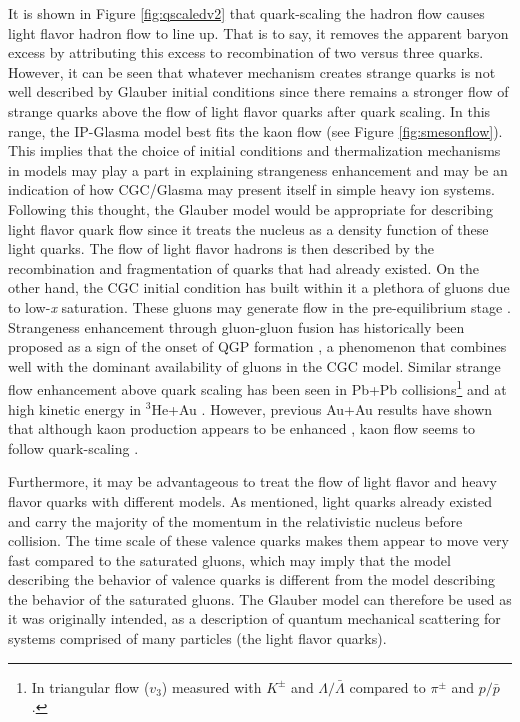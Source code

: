 It is shown in Figure \ref{fig:qscaledv2} that quark-scaling the hadron flow causes light flavor hadron flow to line up. That is to say, it removes the apparent baryon excess by attributing this excess to recombination of two versus three quarks. However, it can be seen that whatever mechanism creates strange quarks is not well described by Glauber initial conditions since there remains a stronger flow of strange quarks above the flow of light flavor quarks after quark scaling. In this range, the IP-Glasma model best fits the kaon flow (see Figure \ref{fig:smesonflow}). This implies that the choice of initial conditions and thermalization mechanisms in models may play a part in explaining strangeness enhancement and may be an indication of how CGC/Glasma may present itself in simple heavy ion systems. Following this thought, the Glauber model would be appropriate for describing light flavor quark flow since it treats the nucleus as a density function of these light quarks. The flow of light flavor hadrons is then described by the recombination and fragmentation of quarks that had already existed. On the other hand, the CGC initial condition has built within it a plethora of gluons due to low-\textit{x} saturation. These gluons may generate flow in the pre-equilibrium stage \citep{Krasnitz200321}. Strangeness enhancement through gluon-gluon fusion has historically been proposed as a sign of the onset of QGP formation \citep{PhysRevLett.48.1066}, a phenomenon that combines well with the dominant availability of gluons in the CGC model. Similar strange flow enhancement above quark scaling has been seen in Pb+Pb collisions\footnote{In triangular flow ($v_3$) measured with $K^{\pm}$ and $\Lambda/\bar{\Lambda}$ compared to $\pi^{\pm}$ and $p/\bar{p}$.} \citep{1742-6596-668-1-012099} and at high kinetic energy in $^3$He+Au \citep{huangQM2015}. However, previous Au+Au results have shown that although kaon production appears to be enhanced \citep{Hohne:1999jf}, kaon flow seems to follow quark-scaling \citep{PhysRevC.92.034913}. 

Furthermore, it may be advantageous to treat the flow of light flavor and heavy flavor quarks with different models. As mentioned, light quarks already existed and carry the majority of the momentum in the relativistic nucleus before collision. The time scale of these valence quarks makes them appear to move very fast compared to the saturated gluons, which may imply that the model describing the behavior of valence quarks is different from the model describing the behavior of the saturated gluons. The Glauber model can therefore be used as it was originally intended, as a description of quantum mechanical scattering for systems comprised of many particles (the light flavor quarks). 

